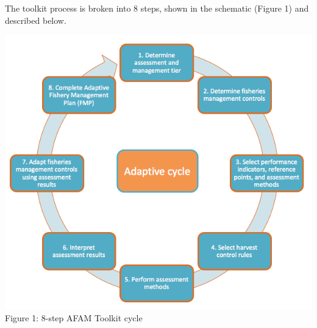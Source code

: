 \documentclass[]{book}
\begin{document}
The toolkit process is broken into 8 steps, shown in the schematic
(Figure 1) and described below.

\includegraphics{myMediaFolder/media/2_image1.png} Figure 1: 8-step AFAM
Toolkit cycle
\end{document}
